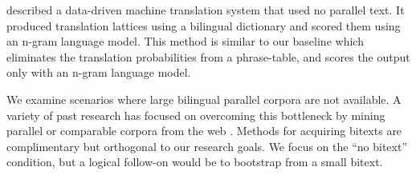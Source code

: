 \documentclass[11pt]{article}
\newcommand{\todo}[1]{\textcolor{red}{TODO: #1}}
\newcommand{\todop}[2]{\noindent\textcolor{red}{TODO for #1:} #2\\}
\begin{document}
 described a data-driven machine translation system that used no parallel text. It produced translation lattices using a bilingual dictionary and scored them using an n-gram language model.  This method is similar to our baseline which eliminates the translation probabilities from a phrase-table, and scores the output only with an n-gram language model.  

We examine scenarios where large bilingual parallel corpora are not available.  A variety of past research has focused on overcoming this bottleneck by mining parallel or comparable corpora from the web \cite{Munteanu:2006,Schwenk2008,Rauf2009,Smith2010,Uszkoreit:2010}.  Methods for acquiring bitexts are complimentary but orthogonal to our research goals.  We focus on the ``no bitext'' condition, but a logical follow-on would be to bootstrap from a small bitext.



\end{document}
